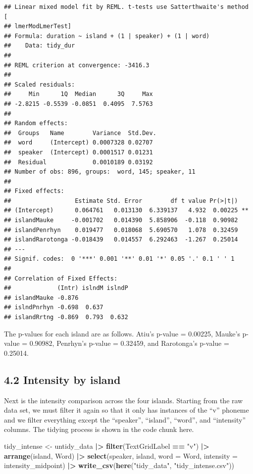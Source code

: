 \documentclass[
  ,man,floatsintext]{apa6}
\newenvironment{Shaded}{\begin{snugshade}}{\end{snugshade}}
\newcommand{\AttributeTok}[1]{\textcolor[rgb]{0.13,0.29,0.53}{#1}}
\newcommand{\FunctionTok}[1]{\textcolor[rgb]{0.13,0.29,0.53}{\textbf{#1}}}
\newcommand{\NormalTok}[1]{#1}
\newcommand{\OtherTok}[1]{\textcolor[rgb]{0.56,0.35,0.01}{#1}}
\newcommand{\SpecialCharTok}[1]{\textcolor[rgb]{0.81,0.36,0.00}{\textbf{#1}}}
\newcommand{\StringTok}[1]{\textcolor[rgb]{0.31,0.60,0.02}{#1}}
\begin{document}
\begin{verbatim}
## Linear mixed model fit by REML. t-tests use Satterthwaite's method [
## lmerModLmerTest]
## Formula: duration ~ island + (1 | speaker) + (1 | word)
##    Data: tidy_dur
## 
## REML criterion at convergence: -3416.3
## 
## Scaled residuals: 
##     Min      1Q  Median      3Q     Max 
## -2.8215 -0.5539 -0.0851  0.4095  7.5763 
## 
## Random effects:
##  Groups   Name        Variance  Std.Dev.
##  word     (Intercept) 0.0007328 0.02707 
##  speaker  (Intercept) 0.0001517 0.01231 
##  Residual             0.0010189 0.03192 
## Number of obs: 896, groups:  word, 145; speaker, 11
## 
## Fixed effects:
##                  Estimate Std. Error        df t value Pr(>|t|)   
## (Intercept)      0.064761   0.013130  6.339137   4.932  0.00225 **
## islandMauke     -0.001702   0.014390  5.858906  -0.118  0.90982   
## islandPenrhyn    0.019477   0.018068  5.690570   1.078  0.32459   
## islandRarotonga -0.018439   0.014557  6.292463  -1.267  0.25014   
## ---
## Signif. codes:  0 '***' 0.001 '**' 0.01 '*' 0.05 '.' 0.1 ' ' 1
## 
## Correlation of Fixed Effects:
##             (Intr) islndM islndP
## islandMauke -0.876              
## islndPnrhyn -0.698  0.637       
## islandRrtng -0.869  0.793  0.632
\end{verbatim}

The p-values for each island are as follows. Atiu's p-value = 0.00225, Mauke's p-value = 0.90982, Penrhyn's p-value = 0.32459, and Rarotonga's p-value = 0.25014.

\subsection{4.2 Intensity by island}\label{intensity-by-island}

Next is the intensity comparison across the four islands. Starting from the raw data set, we must filter it again so that it only has instances of the ``v'' phoneme and we filter everything except the ``speaker'', ``island'', ``word'', and ``intensity'' columns. The tidying process is shown in the code chunk here.

\begin{Shaded}
\begin{Highlighting}[]
\NormalTok{tidy\_intense }\OtherTok{\textless{}{-}}\NormalTok{ untidy\_data }\SpecialCharTok{|\textgreater{}}
  \FunctionTok{filter}\NormalTok{(TextGridLabel }\SpecialCharTok{==} \StringTok{"v"}\NormalTok{) }\SpecialCharTok{|\textgreater{}}  
  \FunctionTok{arrange}\NormalTok{(island, Word) }\SpecialCharTok{|\textgreater{}}  
  \FunctionTok{select}\NormalTok{(speaker, island, }\AttributeTok{word =}\NormalTok{ Word, }\AttributeTok{intensity =}\NormalTok{ intensity\_midpoint) }\SpecialCharTok{|\textgreater{}}
  \FunctionTok{write\_csv}\NormalTok{(}\FunctionTok{here}\NormalTok{(}\StringTok{"tidy\_data"}\NormalTok{, }\StringTok{"tidy\_intense.csv"}\NormalTok{))}
\end{Highlighting}
\end{Shaded}
\end{document}
